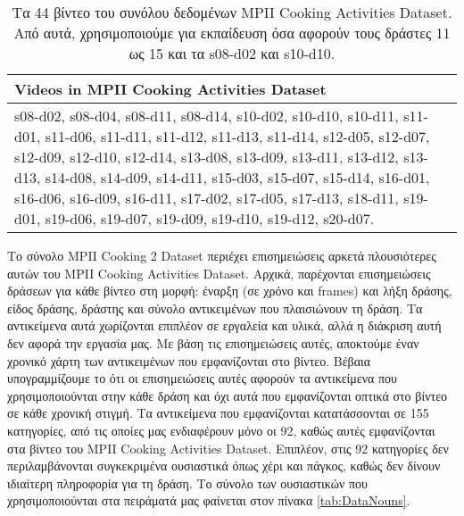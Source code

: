 \begin{table}
    \begin{tabular}{|p{13.5cm}|}
    \hline
    Videos in MPII Cooking Activities Dataset \\ \hline
    s08-d02, s08-d04, s08-d11, s08-d14, s10-d02, s10-d10, s10-d11, s11-d01, s11-d06, s11-d11, s11-d12, s11-d13, s11-d14, s12-d05, s12-d07, s12-d09, s12-d10, s12-d14, s13-d08, s13-d09, s13-d11, s13-d12, s13-d13, s14-d08, s14-d09, s14-d11, s15-d03, s15-d07, s15-d14, s16-d01, s16-d06, s16-d09, s16-d11, s17-d02, s17-d05, s17-d13, s18-d11, s19-d01, s19-d06, s19-d07, s19-d09, s19-d10, s19-d12, s20-d07. \\
    \hline
    \end{tabular}
	\caption{Τα 44 βίντεο του συνόλου δεδομένων MPII Cooking Activities Dataset. Από αυτά, χρησιμοποιούμε για εκπαίδευση όσα αφορούν τους δράστες 11 ως 15 και τα s08-d02 και s10-d10.}
	\label{tab:DataVideos}
\end{table}



\par Το σύνολο MPII Cooking 2 Dataset περιέχει επισημειώσεις αρκετά πλουσιότερες αυτών του MPII Cooking Activities Dataset. Αρχικά, παρέχονται επισημειώσεις δράσεων για κάθε βίντεο στη μορφή: έναρξη (σε χρόνο και frames) και λήξη δράσης, είδος δράσης, δράστης και σύνολο αντικειμένων που πλαισιώνουν τη δράση. Τα αντικείμενα αυτά χωρίζονται επιπλέον σε εργαλεία και υλικά, αλλά η διάκριση αυτή δεν αφορά την εργασία μας. Με βάση τις επισημειώσεις αυτές, αποκτούμε έναν χρονικό χάρτη των αντικειμένων που εμφανίζονται στο βίντεο. Βέβαια υπογραμμίζουμε το ότι οι επισημειώσεις αυτές αφορούν τα αντικείμενα που χρησιμοποιούνται στην κάθε δράση και όχι αυτά που εμφανίζονται οπτικά στο βίντεο σε κάθε χρονική στιγμή. Τα αντικείμενα που εμφανίζονται κατατάσσονται σε 155 κατηγορίες, από τις οποίες μας ενδιαφέρουν μόνο οι 92, καθώς αυτές εμφανίζονται στα βίντεο του MPII Cooking Activities Dataset. Επιπλέον, στις 92 κατηγορίες δεν περιλαμβάνονται συγκεκριμένα ουσιαστικά όπως χέρι και πάγκος, καθώς δεν δίνουν ιδιαίτερη πληροφορία για τη δράση. Το σύνολο των ουσιαστικών που χρησιμοποιούνται στα πειράματά μας φαίνεται στον πίνακα \ref{tab:DataNouns}.

